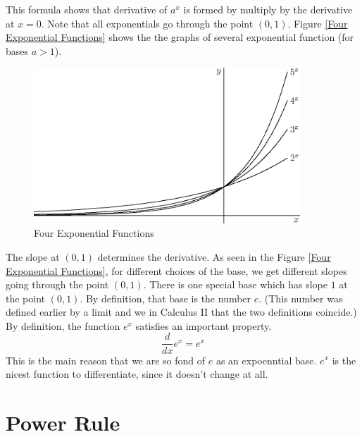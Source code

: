 \documentclass[fleqn]{report}
\begin{document}
This formula shows that derivative of $a^x$ is formed by
multiply by the derivative at $x=0$. Note that all
exponentials go through the point $(0,1)$. Figure \ref{Four
Exponential Functions} shows the the graphs of several
exponential function (for bases $a > 1$).

\begin{figure}[t]
\centering
\includegraphics[width=10cm]{figure49.eps}
\caption{Four Exponential Functions}
\label{Four Exponential Functions}
\end{figure}

The slope at $(0,1)$ determines
the derivative. As seen in the Figure \ref{Four Exponential
Functions}, for different
choices of the base, we get different slopes going through the
point $(0,1)$. There is one special base which has slope $1$ at the
point $(0,1)$. By definition, that base is the number $e$.
(This number was defined earlier by a limit and we in Calculus
II that the two definitions coincide.) By definition, the
function $e^x$ satisfies an important property.
\begin{equation*}
\frac{d}{dx} e^x = e^x
\end{equation*}
This is the main reason that we are so fond of $e$ as an
expoenntial base. $e^x$ is the nicest function to
differentiate, since it doesn't change at all. 

\section*{Power Rule}
\end{document}
